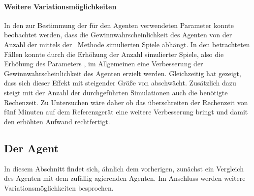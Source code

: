 \paragraph{Weitere Variationsmöglichkeiten}
In den zur Bestimmung der für den Agenten verwendeten Parameter konnte beobachtet werden, dass die Gewinnwahrscheinlichkeit des Agenten von der Anzahl der mittels der \mc\ Methode simulierten Spiele abhängt. In den betrachteten Fällen konnte durch die Erhöhung der Anzahl simulierter Spiele, also die Erhöhung des Parameters , im Allgemeinen eine Verbesserung der Gewinnwahrscheinlichkeit des Agenten erzielt werden. Gleichzeitig hat \cite{nijssen_2007} gezeigt, dass sich dieser Effekt mit steigender Größe von  abschwächt. Zusätzlich dazu steigt mit der Anzahl der durchgeführten Simulationen auch die benötigte Rechenzeit. Zu Untersuchen wäre daher ob das überschreiten der Rechenzeit von fünf Minuten auf dem Referenzgerät eine weitere Verbesserung bringt und damit den erhöhten Aufwand rechtfertigt.

\subsection{Der Agent \mxZitat{\abp}}
\authorpatrick
In diesem Abschnitt findet sich, ähnlich dem vorherigen, zunächst ein Vergleich des \mxZitat{\abp} Agenten mit dem zufällig agierenden Agenten. Im Anschluss werden weitere Variationsmöglichkeiten besprochen. 
